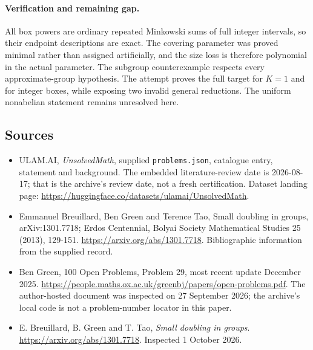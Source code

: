 \documentclass[11pt,a4paper]{article}
\begin{document}
\paragraph{Verification and remaining gap.}
All box powers are ordinary repeated Minkowski sums of full integer intervals, so their endpoint descriptions are exact. The covering parameter was proved minimal rather than assigned artificially, and the size loss is therefore polynomial in the actual parameter. The subgroup counterexample respects every approximate-group hypothesis. The attempt proves the full target for $K=1$ and for integer boxes, while exposing two invalid general reductions. The uniform nonabelian statement remains unresolved here.

\subsection{Sources}

{\small

\begin{itemize}

\item[\hypertarget{source:statement:1}{S1}] ULAM.AI, \emph{UnsolvedMath}, supplied \texttt{problems.json}, catalogue entry, statement and background. The embedded literature-review date is 2026-08-17; that is the archive’s review date, not a fresh certification. Dataset landing page: \url{https://huggingface.co/datasets/ulamai/UnsolvedMath}.

\item[\hypertarget{source:statement:2}{S2}] Emmanuel Breuillard, Ben Green and Terence Tao, Small doubling in groups, arXiv:1301.7718; Erdos Centennial, Bolyai Society Mathematical Studies 25 (2013), 129-151. \url{https://arxiv.org/abs/1301.7718}. Bibliographic information from the supplied record.

\item[\hypertarget{source:statement:3}{S3}] Ben Green, 100 Open Problems, Problem 29, most recent update December 2025. \url{https://people.maths.ox.ac.uk/greenbj/papers/open-problems.pdf}. The author-hosted document was inspected on 27 September 2026; the archive’s local code is not a problem-number locator in this paper.

\item[E1] E. Breuillard, B. Green and T. Tao, \emph{Small doubling in groups}. \url{https://arxiv.org/abs/1301.7718}. Inspected 1 October 2026.

\end{itemize}

}

\label{end:statement}
\end{document}
